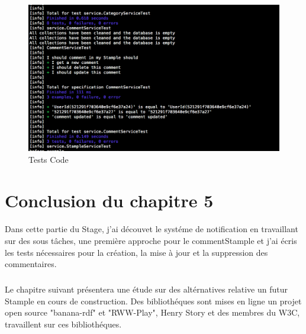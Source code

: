 \begin{figure}[H]
        \centering
                \centering
                \includegraphics[width=\textwidth]{code.png}
               \caption{Tests Code}
		\label{fig:Test Code}
\end{figure}
\section{Conclusion du chapitre 5}
\paragraph{}
Dans cette partie du Stage, j'ai découvet le systéme de notification en travaillant sur des sous tâches, une première approche pour le commentStample et j'ai écris les tests nécessaires pour la création, la mise à jour et la suppression des commentaires.
\subparagraph{}
Le chapitre suivant présentera une étude sur des altérnatives relative un futur Stample en cours de construction.
Des bibliothéques sont mises en ligne un projet open source "banana-rdf" et "RWW-Play", Henry Story et des membres du W3C, travaillent sur ces bibliothéques.